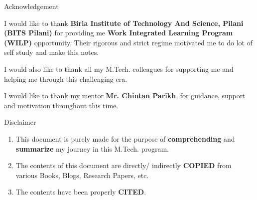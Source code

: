 \thispagestyle{empty}


\begin{center}
    \Huge Acknowledgement
    \vspace{0.5cm}
\end{center}


\begin{justify}
    I would like to thank \textbf{Birla Institute of Technology And Science, Pilani (BITS Pilani)} for providing me \textbf{Work Integrated Learning Program (WILP)} opportunity. Their rigorous and strict regime motivated me to do lot of self study and make this notes.
    
    
    
    I would also like to thank all my M.Tech. colleagues for supporting me and helping me through this challenging era.

    I would like to thank my mentor \textbf{Mr. Chintan Parikh}, for guidance, support and motivation throughout this time.


    
    
\end{justify}


\vspace{5cm}

\begin{center}
    \Huge Disclaimer
    \vspace{0.5cm}
\end{center}

\begin{enumerate}
    \item This document is purely made for the purpose of \textbf{comprehending} and \textbf{summarize} my journey in this M.Tech. program.

    \item The contents of this document are directly/ indirectly \textbf{COPIED} from various Books, Blogs, Research Papers, etc.

    \item The contents have been properly \textbf{CITED}.
\end{enumerate}


\restoregeometry

